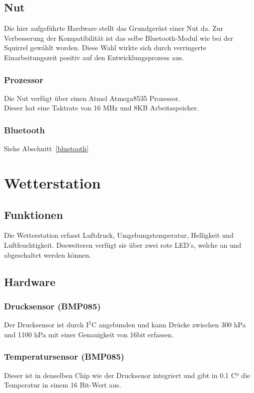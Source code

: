 \documentclass[12pt,a4paper]{article}
\begin{document}
\subsection{Nut}

Die hier aufgeführte Hardware stellt das Grundgerüst einer Nut da.
Zur Verbesserung der Kompatibilität ist das selbe Bluetooth-Modul wie bei der Squirrel gewählt worden. Diese Wahl wirkte sich durch verringerte Einarbeitungszeit positiv auf den Entwicklungsprozess aus. %

\subsubsection{Prozessor}
Die Nut verfügt über einen Atmel Atmega8535 Prozessor.\\
Dieser hat eine Taktrate von 16 MHz und 8KB Arbeitsspeicher.\\


\subsubsection{Bluetooth}
Siehe Abschnitt~\ref{bluetooth}


\section{Wetterstation}
	\subsection{Funktionen}
	Die Wetterstation erfasst Luftdruck, Umgebungstemperatur, Helligkeit und Luftfeuchtigkeit. Desweiteren verfügt sie über zwei rote LED's, welche an und abgeschaltet werden können.
	\subsection{Hardware}
		\subsubsection{Drucksensor (BMP085)}
		Der Drucksensor ist durch $\text{I}^2$C angebunden und kann Drücke zwischen 300 hPa und 1100 hPa mit einer Genauigkeit von 16bit erfassen.
		\subsubsection{Temperatursensor (BMP085)}
		Dieser ist in denselben Chip wie der Drucksenor integriert und gibt in 0.1 Cº die Temperatur in einem 16 Bit-Wert aus.
\end{document}
